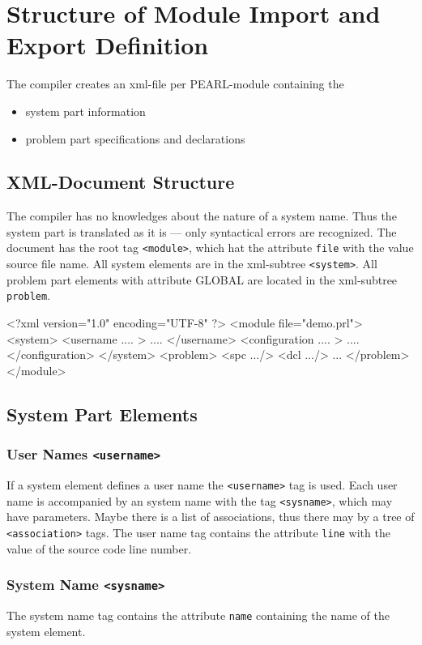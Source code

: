 \chapter{Structure of Module Import and Export Definition}

The compiler creates an xml-file per PEARL-module containing the
\begin{itemize}
\item system part information
\item problem part specifications and declarations
\end{itemize}

\section{XML-Document Structure}
The compiler has no knowledges about the nature of a system name.
Thus the system part is translated as it is --- only syntactical errors
are recognized. 
The document has the root tag \verb|<module>|, which hat the attribute
\verb|file| with the value source file name.  
All system elements are in the xml-subtree \verb|<system>|.
All problem part elements with attribute GLOBAL are located
in the xml-subtree \verb|problem|.

\begin{XMLCode}
<?xml version="1.0" encoding="UTF-8" ?>
<module file="demo.prl">
<system>
   <username .... >
   ....
   </username>
   <configuration .... >
   ....
   </configuration>
</system>
<problem>
  <spc .../>
  <dcl .../>
  ...
</problem>
</module>
\end{XMLCode}

\section{System Part Elements}
\subsection{User Names \texttt{<username>}}
If a system element defines a user name the \verb|<username>| tag is 
used. Each user name is accompanied by an system name with the tag 
\verb|<sysname>|, which may have parameters.
Maybe there is a list of associations, thus there may by a tree
of \verb|<association>| tags.
The user name tag contains the attribute \verb|line| with the value of the 
source code line number.

\subsection{System Name \texttt{<sysname>}}
\label{sec_system_names}
The system name tag contains the attribute \verb|name| containing the 
name of the system element.

